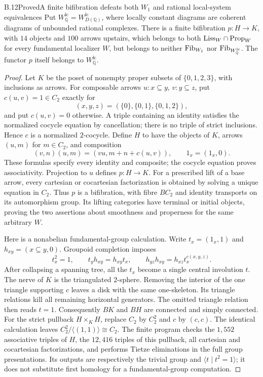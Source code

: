 \begin{claim}{B.12}{Proved}{A finite bifibration defeats both $W_1$ and rational local-system equivalences}
Put $W_{\mathbb Q}^{\mathrm{lc}}=W_{D(\mathbb Q)}^{\mathrm{lc}}$, where
locally constant diagrams are coherent diagrams of unbounded rational
complexes. There is a finite bifibration $p:H\to K$, with $14$ objects and
$100$ arrows upstairs, which belongs to both
$\mathrm{Liss}_W\cap\mathrm{Prop}_W$ for every fundamental localizer $W$, but belongs to
neither $\mathrm{Fib}_{W_1}$ nor $\mathrm{Fib}_{W_{\mathbb Q}^{\mathrm{lc}}}$.
The functor $p$ itself belongs to $W_{\mathbb Q}^{\mathrm{lc}}$.
\end{claim}
\begin{proof}
Let $K$ be the poset of nonempty proper subsets of $\{0,1,2,3\}$, with
inclusions as arrows. For composable arrows $u:x\subseteq y$, $v:y\subseteq z$,
put $c(u,v)=1\in C_2$ exactly for
\[
 (x,y,z)=(\{0\},\{0,1\},\{0,1,2\}),
\]
and put $c(u,v)=0$ otherwise. A triple containing an identity satisfies the
normalized cocycle equation by cancellation; there is no triple of strict
inclusions. Hence $c$ is a normalized $2$-cocycle. Define $H$ to have the
objects of $K$, arrows $(u,m)$ for $m\in C_2$, and composition
\[
 (v,n)(u,m)=(vu,m+n+c(u,v)),\qquad 1_x=(1_x,0).
\]
These formulas specify every identity and composite; the cocycle equation
proves associativity. Projection to $u$ defines $p:H\to K$.
For a prescribed lift of a base arrow, every cartesian or cocartesian
factorization is obtained by solving a unique equation in $C_2$.
Thus $p$ is a bifibration, with fibre $BC_2$ and identity transports on
its automorphism group. Its lifting categories have terminal or initial
objects, proving the two assertions about smoothness and properness for
the same arbitrary $W$.

Here is a nonabelian fundamental-group calculation. Write
$t_x=(1_x,1)$ and $h_{xy}=(x\subseteq y,0)$. Groupoid completion imposes
\[
 t_x^2=1,\qquad t_yh_{xy}=h_{xy}t_x,\qquad
 h_{yz}h_{xy}=h_{xz}t_x^{c(x,y,z)}.
\]
After collapsing a spanning tree, all the $t_x$ become a single central
involution $t$. The nerve of $K$ is the triangulated $2$-sphere.
Removing the interior of the one triangle supporting $c$ leaves a disk
with the same one-skeleton. Its triangle relations kill all remaining
horizontal generators. The omitted triangle relation then reads $t=1$.
Consequently $BK$ and $BH$ are connected and simply connected.
For the strict pullback $H\times_KH$, replace $C_2$ by $C_2^2$ and $c$
by $(c,c)$. The identical calculation leaves
$C_2^2/\langle(1,1)\rangle\cong C_2$.
The finite program checks the $1{,}552$ associative triples of $H$, the
$12{,}416$ triples of this pullback, all cartesian and cocartesian
factorizations, and performs Tietze eliminations in the full group
presentations. Its outputs are respectively the trivial group and
$\langle t\mid t^2=1\rangle$; it does not substitute first homology
for a fundamental-group computation.


\end{proof}
